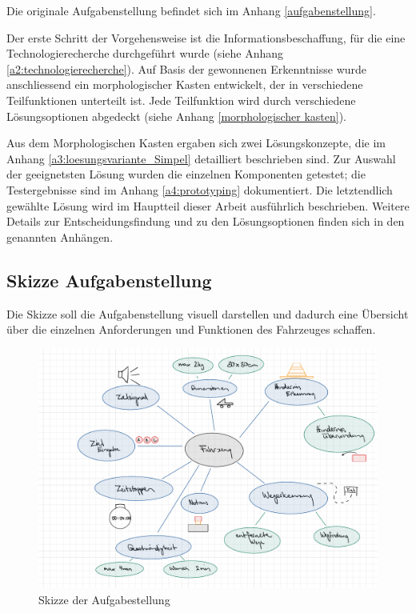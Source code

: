 \documentclass[../main.tex]{subfiles}
\begin{document}
Die originale Aufgabenstellung befindet sich im Anhang \ref{aufgabenstellung}.
\newpage

Der erste Schritt der Vorgehensweise ist die Informationsbeschaffung, für die eine Technologierecherche durchgeführt wurde (siehe Anhang \ref{a2:technologierecherche}). Auf Basis der gewonnenen Erkenntnisse wurde anschliessend ein morphologischer Kasten entwickelt, der in verschiedene Teilfunktionen unterteilt ist. Jede Teilfunktion wird durch verschiedene Lösungsoptionen abgedeckt (siehe Anhang \ref{morphologischer kasten}).

Aus dem Morphologischen Kasten ergaben sich zwei Lösungskonzepte, die im Anhang \ref{a3:loesungsvariante_Simpel} detailliert beschrieben sind. Zur Auswahl der geeignetsten Lösung wurden die einzelnen Komponenten getestet; die Testergebnisse sind im Anhang \ref{a4:prototyping} dokumentiert. Die letztendlich gewählte Lösung wird im Hauptteil dieser Arbeit ausführlich beschrieben. Weitere Details zur Entscheidungsfindung und zu den Lösungsoptionen finden sich in den genannten Anhängen.


\subsection{Skizze Aufgabenstellung}
Die Skizze soll die Aufgabenstellung visuell darstellen und dadurch eine  Übersicht über die einzelnen Anforderungen und Funktionen des Fahrzeuges schaffen.
    \begin{figure}[H]
        \includegraphics[width=\textwidth]{assets/Skizze_Aufgabenstellung.pdf}
        \caption{Skizze der Aufgabestellung}
        \label{img:Skizze_Aufgabenstellung}
    \end{figure} 
 
\end{document}
